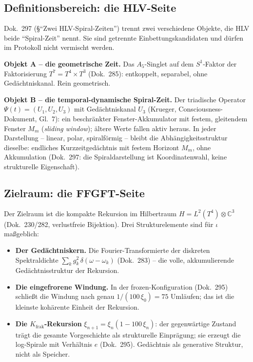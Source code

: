 \subsection*{Definitionsbereich: die HLV-Seite}

Dok.~297 (§\enquote{Zwei HLV-Spiral-Zeiten}) trennt zwei verschiedene
Objekte, die HLV beide \enquote{Spiral-Zeit} nennt. Sie sind getrennte
Einbettungskandidaten und dürfen im Protokoll nicht vermischt werden.

\textbf{Objekt A -- die geometrische Zeit.} Das $A_5$-Singlet auf dem
$S^1$-Faktor der Faktorisierung $T^7 = T^4\times T^3$ (Dok.~285):
entkoppelt, separabel, ohne Gedächtniskanal. Rein geometrisch.

\textbf{Objekt B -- die temporal-dynamische Spiral-Zeit.} Der triadische
Operator $\Psi(t) = (U_1, U_2, U_3)$ mit Gedächtniskanal $U_3$
(Krueger, Consciousness-Dokument, Gl.~7): ein beschränkter
Fenster-Akkumulator mit festem, gleitendem Fenster $M_m$ (\emph{sliding
window}); ältere Werte fallen aktiv heraus. In jeder Darstellung -- linear,
polar, spiralförmig -- bleibt die Abhängigkeitsstruktur dieselbe: endliches
Kurzzeitgedächtnis mit festem Horizont $M_m$, ohne Akkumulation (Dok.~297:
die Spiraldarstellung ist Koordinatenwahl, keine strukturelle Eigenschaft).

\subsection*{Zielraum: die FFGFT-Seite}

Der Zielraum ist die kompakte Rekursion im Hilbertraum
$H = L^2(T^4)\otimes\mathbb{C}^3$ (Dok.~230/282, verlustfreie Bijektion).
Drei Strukturelemente sind für $\iota$ maßgeblich:

\begin{itemize}
  \item \textbf{Der Gedächtniskern.} Die Fourier-Transformierte der
    diskreten Spektraldichte $\sum_k g_k^2\,\delta(\omega-\omega_k)$
    (Dok.~283) -- die volle, akkumulierende Gedächtnisstruktur der
    Rekursion.
  \item \textbf{Die eingefrorene Windung.} In der frozen-Konfiguration
    (Dok.~295) schließt die Windung nach genau $1/(100\,\xi_0) = 75$
    Umläufen; das ist die kleinste kohärente Einheit der Rekursion.
  \item \textbf{Die $K_{\text{frak}}$-Rekursion} $\xi_{n+1} =
    \xi_n(1 - 100\,\xi_n)$: der gegenwärtige Zustand trägt die gesamte
    Vorgeschichte als strukturelle Einprägung; sie erzeugt die
    log-Spirale mit Verhältnis $e$ (Dok.~295). Gedächtnis als generative
    Struktur, nicht als Speicher.
\end{itemize}


